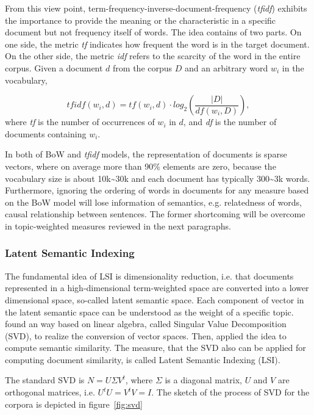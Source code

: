 From this view point, term-frequency-inverse-document-frequency (\textit{tfidf}) exhibits the importance to provide the meaning or the characteristic in a specific document but not frequency itself of words. The idea contains of two parts. On one side, the metric \textit{tf} indicates how frequent the word is in the target document. On the other side, the metric \textit{idf} refers to the scarcity of the word in the entire corpus. Given a document $d$ from the corpus $D$ and an arbitrary word $w_i$ in the vocabulary, 

\begin{equation}
    tfidf(w_i, d) = tf(w_i, d) \cdot log_2(\frac{|D|}{df(w_i, D)}), 
\end{equation}
where \textit{tf} is the number of occurrences of $w_i$ in $d$, and \textit{df} is the number of documents containing $w_i$. 

In both of BoW and \textit{tfidf} models, the representation of documents is sparse vectors, where on average more than 90\% elements are zero, because the vocabulary size is about 10k\textasciitilde 30k and each document has typically 300\textasciitilde 3k words. Furthermore, ignoring the ordering of words in documents for any measure based on the BoW model will lose information of semantics, e.g. relatedness of words, causal relationship between sentences. The former shortcoming will be overcome in topic-weighted measures reviewed in the next paragraphs. 

\subsubsection{Latent Semantic Indexing}

The fundamental idea of LSI is dimensionality reduction, i.e. that documents represented in a high-dimensional term-weighted space are converted into a lower dimensional space, so-called latent semantic space. Each component of vector in the latent semantic space can be understood as the weight of a specific topic.  \cite{Deerwester1990vi} found an way based on linear algebra, called Singular Value Decomposition (SVD), to realize the conversion of vector spaces. Then, \cite{landauer1998introduction} applied the idea to compute semantic similarity. The measure, that the SVD also can be applied for computing document similarity, is called Latent Semantic Indexing (LSI). 

The standard SVD is $N=U\Sigma V^t$, where $\Sigma$ is a diagonal matrix, $U$ and $V$ are orthogonal matrices, i.e. $U^tU=V^tV=I$. The sketch of the process of SVD for the corpora is depicted in figure~\ref{fig:svd} 

